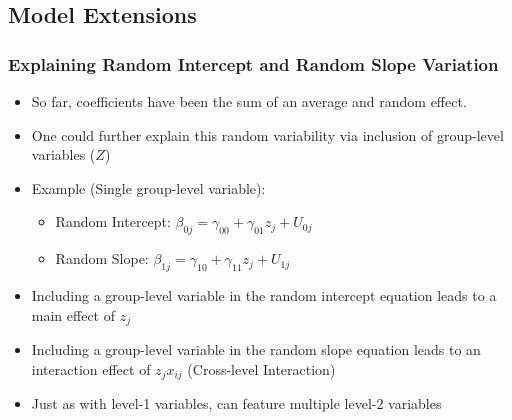 \documentclass{beamer}
\begin{document}
\subsection{Model Extensions}

\begin{frame}
	\frametitle{Explaining Random Intercept and Random Slope Variation}
		\begin{itemize}
			\item So far, coefficients have been the sum of an average and random effect.
			\item One could further explain this random variability via inclusion of group-level variables ($Z$)
			\item Example (Single group-level variable):
				\begin{itemize}
					\item Random Intercept: $\beta_{0j}=\gamma_{00}+\gamma_{01}z_{j}+U_{0j}$
					\item Random Slope: $\beta_{1j}=\gamma_{10}+\gamma_{11}z_{j}+U_{1j}$
				\end{itemize}
			\item Including a group-level variable in the random intercept equation leads to a main effect of $z_{j}$
			\item Including a group-level variable in the random slope equation leads to an interaction effect of $z_{j}x_{ij}$ (Cross-level Interaction)
			\item Just as with level-1 variables, can feature multiple level-2 variables
		\end{itemize}
\end{frame}
\end{document}
